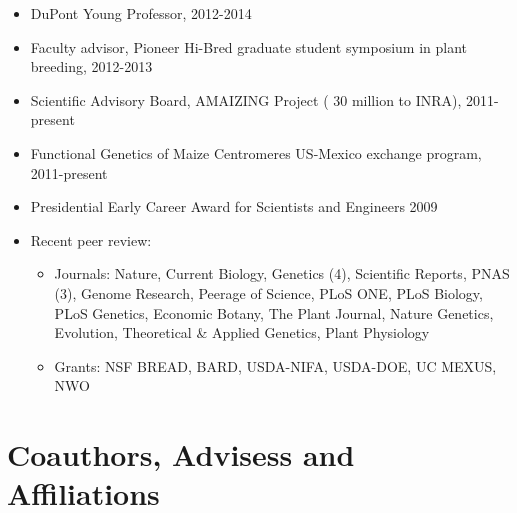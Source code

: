 \documentclass[11pt]{article}
\begin{document}
\begin{itemize} \setlength{\itemsep}{0pt} \setlength{\parskip}{2pt} \setlength{\parsep}{0pt}

\item DuPont Young Professor, 2012-2014

\item Faculty advisor, Pioneer Hi-Bred graduate student symposium in plant breeding, 2012-2013

\item Scientific Advisory Board, AMAIZING Project ( 30 million to INRA), 2011-present 

\item Functional Genetics of Maize Centromeres US-Mexico exchange program, 2011-present

\item Presidential Early Career Award for Scientists and Engineers 2009

\item Recent peer review: 
\begin{itemize} 
\item Journals: Nature, Current Biology, Genetics (4), Scientific Reports, PNAS (3), Genome Research, Peerage of Science, PLoS ONE, PLoS Biology, PLoS Genetics, Economic Botany, The Plant Journal, Nature Genetics, Evolution, Theoretical \& Applied Genetics, Plant Physiology%

\item Grants: NSF BREAD, BARD, USDA-NIFA, USDA-DOE, UC MEXUS, NWO
\end{itemize}
\end{itemize}


\section{Coauthors, Advisess and Affiliations}
\end{document}
